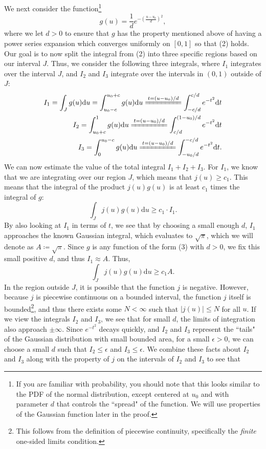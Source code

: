 \documentclass[12pt]{article}
\theoremstyle{plain}
\theoremstyle{definition}
\begin{document}
We next consider the function\footnote{If you are familiar with probability, you should note that this looks similar to the PDF of the normal distribution, except centered at $u_0$ and with parameter $d$ that controls the ``spread" of the function. We will use properties of the Gaussian function later in the proof.}
\begin{equation}
    g(u)=\frac{1}{d}e^{-\left(\frac{u-u_0}{d}\right)^2},
\end{equation}
where we let $d>0$ to ensure that $g$ has the property mentioned above of having a power series expansion which converges uniformly on $[0,1]$ so that (2) holds. Our goal is to now split the integral from (2) into three specific regions based on our interval $J$. Thus, we consider the following three integrals, where $I_1$ integrates over the interval $J$, and $I_2$ and $I_3$ integrate over the intervals in $(0,1)$ outside of $J$:
\begin{align}
    I_1 = \int_{J}g(u)\mathrm{d}u = \int_{u_0-c}^{u_0+c}g(u)\mathrm{d}u \xlongequal{t=(u-u_0)/d} \int_{-c/d}^{c/d}e^{-t^2} \mathrm{d}t \\
    I_2 = \int_{u_0+c}^{1}g(u)\mathrm{d}u \xlongequal{t=(u-u_0)/d} \int_{c/d}^{(1-u_0)/d} e^{-t^2} \mathrm{d}t \\
    I_3 = \int_{0}^{u_0 - c}g(u) \mathrm{d}u \xlongequal{t=(u-u_0)/d} \int_{-u_0/d}^{-c/d} e^{-t^2} \mathrm{d}t.
\end{align}
We can now estimate the value of the total integral $I_1+I_2+I_3$. For $I_1$, we know that we are integrating over our region $J$, which means that $j(u)\geq c_1$. This means that the integral of the product $j(u)g(u)$ is at least $c_1$ times the integral of $g$:
\begin{equation}
    \int_J j(u)g(u) \mathrm{d}u\geq c_1\cdot I_1.
\end{equation}
By also looking at $I_1$ in terms of $t$, we see that by choosing a small enough $d$, $I_1$ approaches the known Gaussian integral, which evaluates to $\sqrt{\pi}$, which we will denote as $A\coloneq \sqrt{\pi}$. Since $g$ is any function of the form (3) with $d>0$, we fix this small positive $d$, and thus $I_1\approx A$. Thus,
\begin{equation}
    \int_J j(u)g(u)\mathrm{d}u \geq c_1 A.
\end{equation}
In the region outside $J$, it is possible that the function $j$ is negative. However, because $j$ is piecewise continuous on a bounded interval, the function $j$ itself is bounded\footnote{This follows from the definition of piecewise continuity, specifically the \emph{finite} one-sided limits condition.}, and thus there exists some $N<\infty$ such that $|j(u)|\leq N$ for all $u$. If we view the integrals $I_2$ and $I_3$, we see that for small $d$, the limits of integration also approach $\pm \infty$. Since $e^{-t^2}$ decays quickly, and $I_2$ and $I_3$ represent the ``tails" of the Gaussian distribution with small bounded area, for a small $\epsilon>0$, we can choose a small $d$ such that $I_2\leq \epsilon$ and $I_3\leq \epsilon$. We combine these facts about $I_2$ and $I_3$ along with the property of $j$ on the intervals of $I_2$ and $I_3$ to see that
\end{document}
